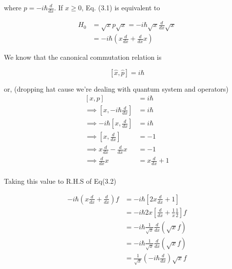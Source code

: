 \documentclass[12pt]{report}
\newcommand*{\1}{\hspace{1pt}}
\begin{document}
        where $p = -i\hbar \frac{d}{dx}$. If $x\geqslant 0$, Eq. (3.1) is equivalent to

        \begin{equation}
            \begin{split}
                H_{0} &= \sqrt{x} p \sqrt{x} = -i\hbar \sqrt{x} \frac{d}{dx} \sqrt{x}\\ 
                &= -i\hbar\left(x\frac{d}{dx}+\frac{d}{dx}x\right)
            \end{split}
        \end{equation}

        We know that the canonical commutation relation is 
        
        \begin{equation}
            \left[\hat{x},\hat{p}\right] = i\hbar
        \end{equation}
        
        or, (dropping hat cause we're dealing with quantum system and operators)
        \begin{equation}
            \begin{split}
                \left[x,p\right] &= i\hbar \\ 
                \implies \left[x,-i\hbar\frac{d}{dx}\right] &= i\hbar \\
                \implies -i\hbar\left[x,\frac{d}{dx}\right] &= i\hbar \\
                \implies \left[x,\frac{d}{dx}\right] &= -1 \\
                \implies x\frac{d}{dx} - \frac{d}{dx}x &= -1 \\
                \implies  \frac{d}{dx}x &= x\frac{d}{dx} + 1 \\
            \end{split}
        \end{equation}

        Taking this value to R.H.S of Eq(3.2)

        \begin{equation}
            \begin{split}
                -i\hbar\left(x\frac{d}{dx} + \frac{d}{dx}\right)f &= -i\hbar\left[2x\frac{d}{dx}+1\right] \\ 
                & = -i\hbar2x\left[\frac{d}{dx}+\frac{1}{x}\frac{1}{2}\right]f \\ 
                & =  -i\hbar\frac{1}{\sqrt{x}}\frac{d}{dx}\left(\sqrt{x}f\right) \\ 
                & =  -i\hbar\frac{1}{\sqrt{x}}\frac{d}{dx}\left(\sqrt{x}f\right) \\ 
                & =  \frac{1}{\sqrt{x}}\left(-i\hbar\frac{d}{dx}\right)\sqrt{x}f \\ 
            \end{split}
        \end{equation}
\end{document}
